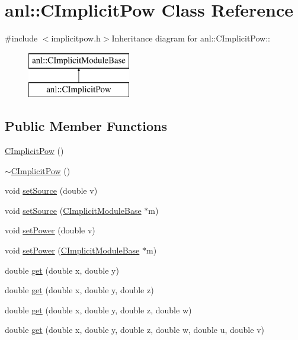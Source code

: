 \hypertarget{classanl_1_1CImplicitPow}{
\section{anl::CImplicitPow Class Reference}
\label{classanl_1_1CImplicitPow}
}


{\ttfamily \#include $<$implicitpow.h$>$}Inheritance diagram for anl::CImplicitPow::\begin{figure}[H]
\begin{center}
\leavevmode
\includegraphics[height=2cm]{classanl_1_1CImplicitPow}
\end{center}
\end{figure}
\subsection*{Public Member Functions}
\begin{DoxyCompactItemize}
\item 
\hyperlink{classanl_1_1CImplicitPow_afa3eb17e6b117bae52797598a1d223b2}{CImplicitPow} ()
\item 
\hyperlink{classanl_1_1CImplicitPow_afa502e9f519d89a836f163cd5ac8fb3a}{$\sim$CImplicitPow} ()
\item 
void \hyperlink{classanl_1_1CImplicitPow_ac717e60af1d88a41b3d48c3da2430c76}{setSource} (double v)
\item 
void \hyperlink{classanl_1_1CImplicitPow_a596142e97efeeff173835acda522e933}{setSource} (\hyperlink{classanl_1_1CImplicitModuleBase}{CImplicitModuleBase} $\ast$m)
\item 
void \hyperlink{classanl_1_1CImplicitPow_ae7c4bf26ecc28386101c22c3628e2ca6}{setPower} (double v)
\item 
void \hyperlink{classanl_1_1CImplicitPow_a663be4a5421ffcd2dbf2d41574dec821}{setPower} (\hyperlink{classanl_1_1CImplicitModuleBase}{CImplicitModuleBase} $\ast$m)
\item 
double \hyperlink{classanl_1_1CImplicitPow_af8b092909ba5aaf13ce199477613a9e0}{get} (double x, double y)
\item 
double \hyperlink{classanl_1_1CImplicitPow_aad892840e7a9570d4ae0441cfbe61c4e}{get} (double x, double y, double z)
\item 
double \hyperlink{classanl_1_1CImplicitPow_a541948e854797b149ff0c9a29599d50d}{get} (double x, double y, double z, double w)
\item 
double \hyperlink{classanl_1_1CImplicitPow_abb17667145906c16e125ec7c5fb86461}{get} (double x, double y, double z, double w, double u, double v)
\end{DoxyCompactItemize}
